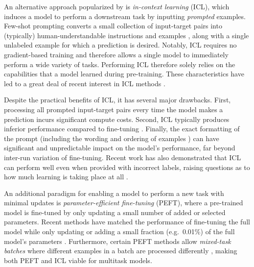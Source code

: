 An alternative approach popularized by \cite{radford2019language,brown2020language} is \textit{in-context learning} (ICL), which induces a model to perform a downstream task by inputting \textit{prompted} examples. Few-shot prompting converts a small collection of input-target pairs into (typically) human-understandable instructions and examples \cite{radford2019language,brown2020language}, along with a single unlabeled example for which a prediction is desired. Notably, ICL requires no gradient-based training and therefore allows a single model to immediately perform a wide variety of tasks. Performing ICL therefore solely relies on the capabilities that a model learned during pre-training. These characteristics have led to a great deal of recent interest in ICL methods \citep{chen2021meta,min2021metaicl,lampinen2022can,lazaridou2022internet,min2022rethinking,wang2022benchmarking}.

Despite the practical benefits of ICL, it has several major drawbacks. First, processing all prompted input-target pairs every time the model makes a prediction incurs significant compute costs. Second, ICL typically produces inferior performance compared to fine-tuning \cite{brown2020language}. Finally, the exact formatting of the prompt (including the wording \cite{webson2021prompt} and ordering of examples \cite{zhao2021calibrate}) can have significant and unpredictable impact on the model's performance, far beyond inter-run variation of fine-tuning. Recent work has also demonstrated that ICL can perform well even when provided with incorrect labels, raising questions as to how much learning is taking place at all \citep{min2022rethinking}.

An additional paradigm for enabling a model to perform a new task with minimal updates is \textit{parameter-efficient fine-tuning} (PEFT), where a pre-trained model is fine-tuned by only updating a small number of added or selected parameters. Recent methods have matched the performance of fine-tuning the full model while only updating or adding a small fraction (e.g.\ 0.01\%) of the full model's parameters \cite{hu2021lora,lester2021power}. Furthermore, certain PEFT methods allow \textit{mixed-task batches} where different examples in a batch are processed differently \citep{lester2021power}, making both PEFT and ICL viable for multitask models. 

